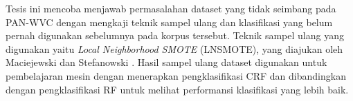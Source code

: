 Tesis ini mencoba menjawab permasalahan dataset yang tidak seimbang pada
PAN-WVC dengan mengkaji teknik sampel ulang dan klasifikasi yang belum pernah
digunakan sebelumnya pada korpus tersebut.
Teknik sampel ulang yang digunakan yaitu
\textit{Local Neighborhood SMOTE} (LNSMOTE),
yang diajukan oleh Maciejewski dan
Stefanowski
\cite{maciejewski2011local}.
Hasil sampel ulang dataset digunakan untuk pembelajaran mesin dengan menerapkan
pengklasifikasi CRF dan dibandingkan dengan pengklasifikasi RF untuk melihat
performansi klasifikasi yang lebih baik.
